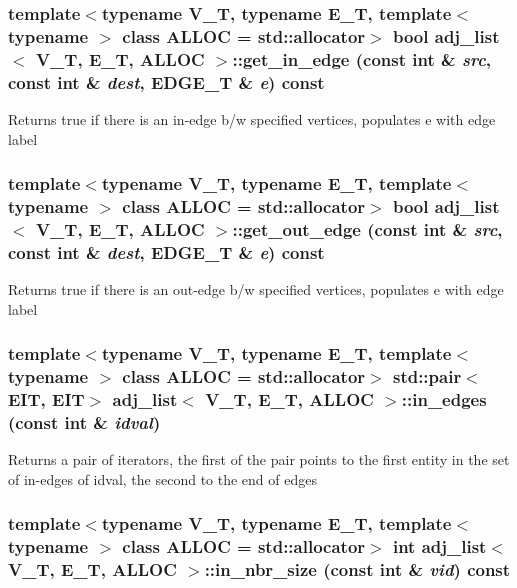 \subsubsection{\setlength{\rightskip}{0pt plus 5cm}template$<$typename V\_\-T, typename E\_\-T, template$<$ typename $>$ class ALLOC = std::allocator$>$ bool \bf{adj\_\-list}$<$ V\_\-T, E\_\-T, ALLOC $>$::get\_\-in\_\-edge (const int \& {\em src}, const int \& {\em dest}, EDGE\_\-T \& {\em e}) const\hspace{0.3cm}{\tt  [inline]}}\label{classadj__list_557198f0715d439769a12eaa778926b3}


Returns true if there is an in-edge b/w specified vertices, populates e with edge label 
\subsubsection{\setlength{\rightskip}{0pt plus 5cm}template$<$typename V\_\-T, typename E\_\-T, template$<$ typename $>$ class ALLOC = std::allocator$>$ bool \bf{adj\_\-list}$<$ V\_\-T, E\_\-T, ALLOC $>$::get\_\-out\_\-edge (const int \& {\em src}, const int \& {\em dest}, EDGE\_\-T \& {\em e}) const\hspace{0.3cm}{\tt  [inline]}}\label{classadj__list_11a3657e714fb9a2377728ddecc18387}


Returns true if there is an out-edge b/w specified vertices, populates e with edge label 
\subsubsection{\setlength{\rightskip}{0pt plus 5cm}template$<$typename V\_\-T, typename E\_\-T, template$<$ typename $>$ class ALLOC = std::allocator$>$ std::pair$<$EIT, EIT$>$ \bf{adj\_\-list}$<$ V\_\-T, E\_\-T, ALLOC $>$::in\_\-edges (const int \& {\em idval})\hspace{0.3cm}{\tt  [inline]}}\label{classadj__list_2f975ddeb1a5877382218339f761774e}


Returns a pair of iterators, the first of the pair points to the first entity in the set of in-edges of idval, the second to the end of edges 
\subsubsection{\setlength{\rightskip}{0pt plus 5cm}template$<$typename V\_\-T, typename E\_\-T, template$<$ typename $>$ class ALLOC = std::allocator$>$ int \bf{adj\_\-list}$<$ V\_\-T, E\_\-T, ALLOC $>$::in\_\-nbr\_\-size (const int \& {\em vid}) const\hspace{0.3cm}{\tt  [inline]}}\label{classadj__list_4e7ddf5073ce4d1e79a8d3682e1560a6}


